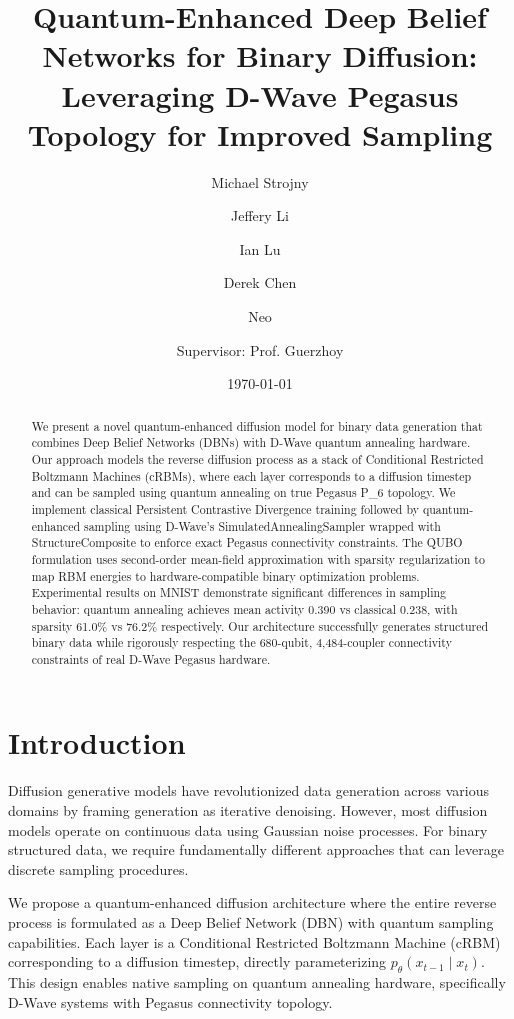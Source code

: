 \documentclass[11pt]{article}
\title{\bfseries Quantum-Enhanced Deep Belief Networks for Binary Diffusion: \\
Leveraging D-Wave Pegasus Topology for Improved Sampling}
\author[1]{Michael Strojny}
\author[1]{Jeffery Li}
\author[1]{Ian Lu}
\author[1]{Derek Chen}
\author[1]{Neo}
\author[1]{Supervisor: Prof. Guerzhoy}
\affil[1]{University of Toronto, Department of Computer Science}
\date{\today}
\begin{document}
\maketitle

\begin{abstract}
We present a novel quantum-enhanced diffusion model for binary data generation that combines Deep Belief Networks (DBNs) with D-Wave quantum annealing hardware. Our approach models the reverse diffusion process as a stack of Conditional Restricted Boltzmann Machines (cRBMs), where each layer corresponds to a diffusion timestep and can be sampled using quantum annealing on true Pegasus P_6 topology. We implement classical Persistent Contrastive Divergence training followed by quantum-enhanced sampling using D-Wave's SimulatedAnnealingSampler wrapped with StructureComposite to enforce exact Pegasus connectivity constraints. The QUBO formulation uses second-order mean-field approximation with sparsity regularization to map RBM energies to hardware-compatible binary optimization problems. Experimental results on MNIST demonstrate significant differences in sampling behavior: quantum annealing achieves mean activity 0.390 vs classical 0.238, with sparsity 61.0\% vs 76.2\% respectively. Our architecture successfully generates structured binary data while rigorously respecting the 680-qubit, 4,484-coupler connectivity constraints of real D-Wave Pegasus hardware.
\end{abstract}

\section{Introduction}

Diffusion generative models have revolutionized data generation across various domains by framing generation as iterative denoising. However, most diffusion models operate on continuous data using Gaussian noise processes. For binary structured data, we require fundamentally different approaches that can leverage discrete sampling procedures.

We propose a quantum-enhanced diffusion architecture where the entire reverse process is formulated as a Deep Belief Network (DBN) with quantum sampling capabilities. Each layer is a Conditional Restricted Boltzmann Machine (cRBM) corresponding to a diffusion timestep, directly parameterizing $p_\theta(x_{t-1}\mid x_t)$. This design enables native sampling on quantum annealing hardware, specifically D-Wave systems with Pegasus connectivity topology.
\end{document}
